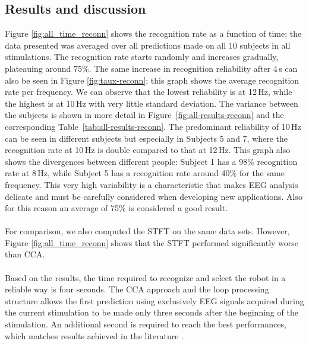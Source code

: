 \documentclass[smallextended]{svjour3}
\begin{document}
\subsection{Results and discussion}
Figure \ref{fig:all_time_reconn} shows the recognition rate as a function of time; the data presented was averaged over all predictions made on all 10 subjects in all stimulations.
The recognition rate starts randomly and increases gradually, plateauing around 75\%.
The same increase in recognition reliability after 4\,s can also be seen in Figure \ref{fig:taux-reconn}; this graph shows the average recognition rate per frequency.
We can observe that the lowest reliability is at 12\,Hz, while the highest is at 10\,Hz with very little standard deviation.
The variance between the subjects is shown in more detail in Figure~\ref{fig:all-results-reconn} and the corresponding Table~\ref{tab:all-results-reconn}.
The predominant reliability of 10\,Hz can be seen in different subjects but especially in Subjects 5 and 7, where the recognition rate at 10\,Hz is double compared to that at 12\,Hz.
This graph also shows the divergences between different people: Subject 1 has a 98\% recognition rate at 8\,Hz, while Subject 5 has a recognition rate around 40\% for the same frequency.
This very high variability is a characteristic that makes EEG analysis delicate and must be carefully considered when developing new applications. 
Also for this reason an average of 75\% is considered a good result.\\
\\
For comparison, we also computed the STFT on the same data sets.
However, Figure \ref{fig:all_time_reconn} shows that the STFT performed significantly worse than CCA.\\
\\
Based on the results, the time required to recognize and select the robot in a reliable way is four seconds. 
The CCA approach and the loop processing structure allows the first prediction using exclusively EEG signals acquired during the current stimulation to be made only three seconds after the beginning of the stimulation.
An additional second is required to reach the best performances, which matches results achieved in the literature \cite{Fan2015,SSVEPfiability,jian2014improving,paper4}. 
\end{document}

